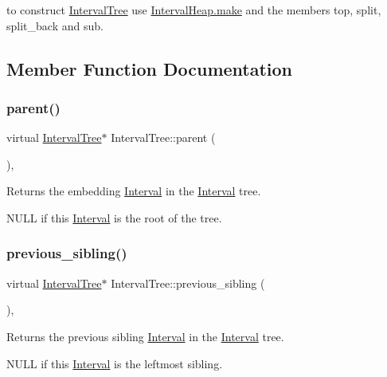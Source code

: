 to construct \mbox{\hyperlink{classIntervalTree}{Interval\+Tree}} use \mbox{\hyperlink{group__segment_gad7fd7dd4ddb8d520df0985e67d180019}{Interval\+Heap.\+make}} and the members top, split, split\+\_\+back and sub. 

\subsection{Member Function Documentation}
\mbox{\label{classIntervalTree_a68c95f629571e4d24caa9dfc669a4412}} 
\subsubsection{\texorpdfstring{parent()}{parent()}}
{\footnotesize\ttfamily virtual \mbox{\hyperlink{classIntervalTree}{Interval\+Tree}}$\ast$ Interval\+Tree\+::parent (\begin{DoxyParamCaption}{ }\end{DoxyParamCaption})\hspace{0.3cm}{\ttfamily [inline]}, {\ttfamily [virtual]}}

\begin{DoxyReturn}{Returns}
the embedding \mbox{\hyperlink{classInterval}{Interval}} in the \mbox{\hyperlink{classInterval}{Interval}} tree. 

N\+U\+LL if this \mbox{\hyperlink{classInterval}{Interval}} is the root of the tree. 
\end{DoxyReturn}
\mbox{\label{classIntervalTree_a0b640dcd2f3e26d31a1d4d7b3fd305ed}} 
\subsubsection{\texorpdfstring{previous\_sibling()}{previous\_sibling()}}
{\footnotesize\ttfamily virtual \mbox{\hyperlink{classIntervalTree}{Interval\+Tree}}$\ast$ Interval\+Tree\+::previous\+\_\+sibling (\begin{DoxyParamCaption}{ }\end{DoxyParamCaption})\hspace{0.3cm}{\ttfamily [inline]}, {\ttfamily [virtual]}}

\begin{DoxyReturn}{Returns}
the previous sibling \mbox{\hyperlink{classInterval}{Interval}} in the \mbox{\hyperlink{classInterval}{Interval}} tree. 

N\+U\+LL if this \mbox{\hyperlink{classInterval}{Interval}} is the leftmost sibling. 
\end{DoxyReturn}


